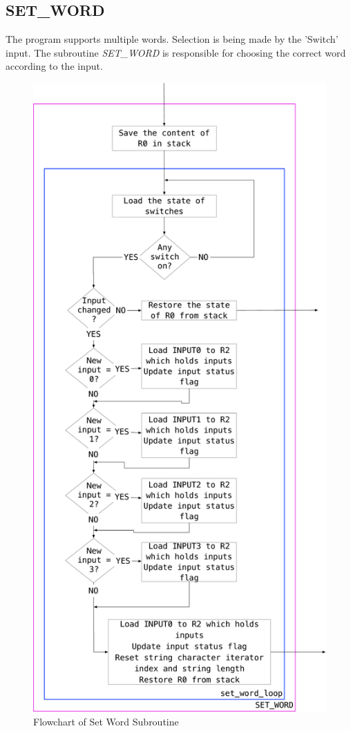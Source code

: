 \documentclass[titlepage]{article}
\begin{document}
	\subsection{SET\_WORD}
	The program supports multiple words. Selection is being made by the 'Switch' input. The subroutine \textit{SET\_WORD} is responsible for choosing the correct word according to the input.
	\begin{figure}[h]
		\centering
		\includegraphics[scale=.23]{../images/set_word.pdf}
		\caption{Flowchart of Set Word Subroutine}
	\end{figure}
	\newpage
\end{document}
